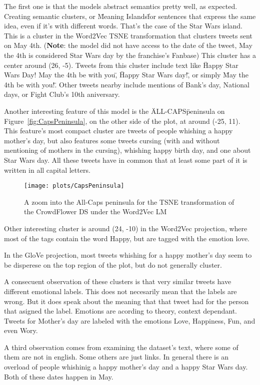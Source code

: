 The first one is that the models abstract semantics pretty well, as expected. Creating semantic clusters, or \"Meaning Islands\" for sentences that express the same idea, even if it's with different words. That's the case of the Star Wars island. This is a cluster in the Word2Vec TSNE transformation that clusters tweets sent on May 4th. (\textbf{Note}: the model did not have access to the date of the tweet, May the 4th is considered Star Wars day by the franchise's Fanbase) This cluster has a center around (26, -5). Tweets from this cluster include text like \"Happy Star Wars Day! May the 4th be with you\", \"Happy Star Wars day!\", or simply \"May the 4th be with you!\". Other tweets nearby include mentions of Bank's day, National days, or Fight Club's 10th aniversary.

Another interesting feature of this model is the \"ALL-CAPS\" peninsula on Figure~\ref{fig:CapsPeninsula}, on the other side of the plot, at around (-25, 11). This feature's most compact cluster are tweets of people whishing a happy mother's day, but also features some tweets cursing (with and without mentioning of mothers in the cursing), whishing happy birth day, and one about Star Wars day. All these tweets have in common that at least some part of it is written in all capital letters.

\begin{figure}[H]
  \texttt{[image: plots/CapsPeninsula]}
  \centering
  \caption{A zoom into the All-Caps peninsula for the TSNE transformation of the CrowdFlower DS under the Word2Vec LM}
\end{figure}\label{fig:CapsPeninsula}

Other interesting cluster is around (24, -10) in the Word2Vec projection, where most of the tags contain the word Happy, but are tagged with the emotion love.

In the GloVe projection, most tweets whishing for a happy mother's day seem to be disperese on the top region of the plot, but do not generally cluster.

A consecuent observation of these clusters is that very similar tweets have different emotional labels. This does not necesarily mean that the labels are wrong. But it does speak about the meaning that that tweet had for the person that asigned the label. Emotions are acording to theory, context dependant. Tweets for Mother's day are labeled with the emotions Love, Happiness, Fun, and even Wory.

A third observation comes from examining the dataset's text, where some of them are not in english. Some others are just links. In general there is an overload of people whishinig a happy mother's day and a happy Star Wars day. Both of these dates happen in May.

